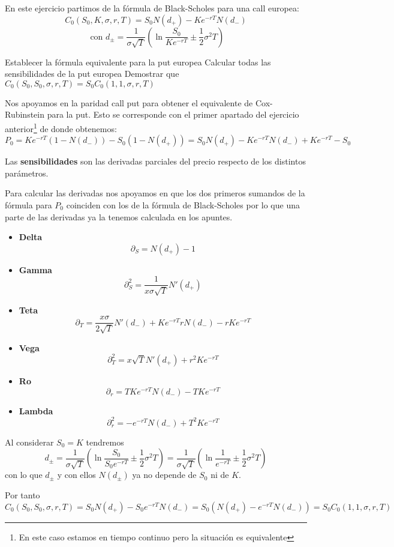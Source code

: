 \begin{problem}[2]
En este ejercicio partimos de la fórmula de Black-Scholes para una call europea:
\[C_0(S_0,K,σ,r,T)=S_0N(d_+)-Ke^{-rT}N(d_-) \]
\[\text{   con } d_{\pm} = \frac{1}{σ\sqrt{T}}\left( \ln \frac{S_0}{Ke^{-rT}}\pm \frac{1}{2}σ^2T\right)\]

\ppart Establecer la fórmula equivalente para la put europea
\ppart Calcular todas las sensibilidades de la put europea
\ppart Demostrar que $C_0(S_0,S_0,σ,r,T)=S_0C_0(1,1,σ,r,T)$
\solution
{}

\spart

Nos apoyamos en la paridad call put para obtener el equivalente de Cox-Rubinstein para la put. Esto se corresponde con el primer apartado del ejercicio anterior\footnote{En este caso estamos en tiempo continuo pero la situación es equivalente} de donde obtenemos:
\[P_0 = Ke^{-rT}(1-N(d_-))-S_0(1-N(d_+)) = S_0N(d_+) -Ke^{-rT}N(d_-)+Ke^{-rT} -S_0 \]

\spart

Las \textbf{sensibilidades} son las derivadas parciales del precio respecto de los distintos parámetros.

Para calcular las derivadas nos apoyamos en que los dos primeros sumandos de la fórmula para $P_0$ coinciden con los de la fórmula de Black-Scholes por lo que una parte de las derivadas ya la tenemos calculada en los apuntes.
\begin{itemize}
\item \textbf{Delta}
\[\partial_S = N(d_+)-1\]
\item \textbf{Gamma}
\[\partial^2_S = \frac{1}{xσ\sqrt{T}}N'(d_+)\]
\item \textbf{Teta}
\[\partial_T = \frac{xσ}{2\sqrt{T}}N'(d_-) + Ke^{-rT}rN(d_-)-rKe^{-rT}\]
\item \textbf{Vega}
\[\partial^2_T = x\sqrt{T}N'(d_+)+r^2Ke^{-rT}\]
\item \textbf{Ro}
\[\partial_r = TKe^{-rT}N(d_-)-TKe^{-rT}\]
\item \textbf{Lambda}
\[\partial^2_r = -e^{-rT}N(d_-)+T^2Ke^{-rT}\]
\end{itemize}

\spart

Al considerar $S_0=K$ tendremos
\[d_{\pm} = \frac{1}{σ\sqrt{T}}\left( \ln \frac{S_0}{S_0e^{-rT}}\pm \frac{1}{2}σ^2T\right)  = \frac{1}{σ\sqrt{T}}\left( \ln \frac{1}{e^{-rT}}\pm \frac{1}{2}σ^2T\right)\]
con lo que $d_{\pm}$ y con ellos $N(d_{\pm})$ ya no depende de $S_0$ ni de $K$.

Por tanto
\[C_0(S_0,S_0,σ,r,T) = S_0N(d_+)-S_0e^{-rT}N(d_-) = S_0\left(N(d_+)-e^{-rT}N(d_-) \right) = S_0 C_0(1,1,σ,r,T)\]
\end{problem}

